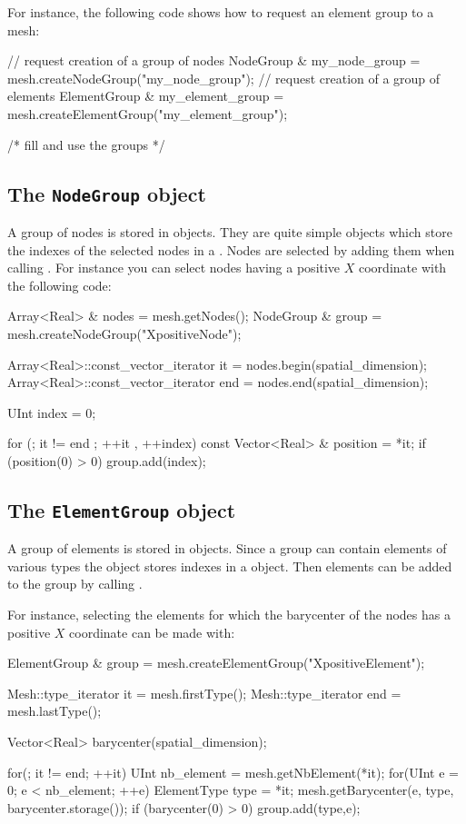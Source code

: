 For instance, the following code shows how to request
an element group to a mesh:

\begin{cpp}
  // request creation of a group of nodes
  NodeGroup & my_node_group = mesh.createNodeGroup("my_node_group");
  // request creation of a group of elements
  ElementGroup & my_element_group = mesh.createElementGroup("my_element_group");

  /* fill and use the groups */
\end{cpp}


\subsection{The \texttt{NodeGroup} object}
A group of nodes is stored in  objects.
They are quite simple objects which store the indexes
of the selected nodes in a .
Nodes are selected by adding them when calling
. For instance you can select nodes
having a positive $X$ coordinate with the following code:
\begin{cpp}
  Array<Real> & nodes = mesh.getNodes();
  NodeGroup & group = mesh.createNodeGroup("XpositiveNode");

  Array<Real>::const_vector_iterator it  = nodes.begin(spatial_dimension);
  Array<Real>::const_vector_iterator end = nodes.end(spatial_dimension);

  UInt index = 0;

  for (; it != end ; ++it , ++index){
    const Vector<Real> & position = *it;
    if (position(0) > 0) group.add(index);
  }
\end{cpp}

\subsection{The \texttt{ElementGroup} object}
A group of elements is stored in  objects.
Since a group can contain elements of various types
the  object stores indexes in
a  object.
Then elements can be added to the group by calling .

For instance, selecting the elements for which the barycenter of the nodes
has a positive $X$ coordinate can be made with:

\begin{cpp}
  ElementGroup & group = mesh.createElementGroup("XpositiveElement");

  Mesh::type_iterator it  = mesh.firstType();
  Mesh::type_iterator end = mesh.lastType();

  Vector<Real> barycenter(spatial_dimension);

  for(; it != end; ++it){
    UInt nb_element  = mesh.getNbElement(*it);
    for(UInt e = 0; e < nb_element; ++e) {
      ElementType type = *it;
      mesh.getBarycenter(e, type, barycenter.storage());
      if (barycenter(0) > 0) group.add(type,e);
    }
  }
\end{cpp}



